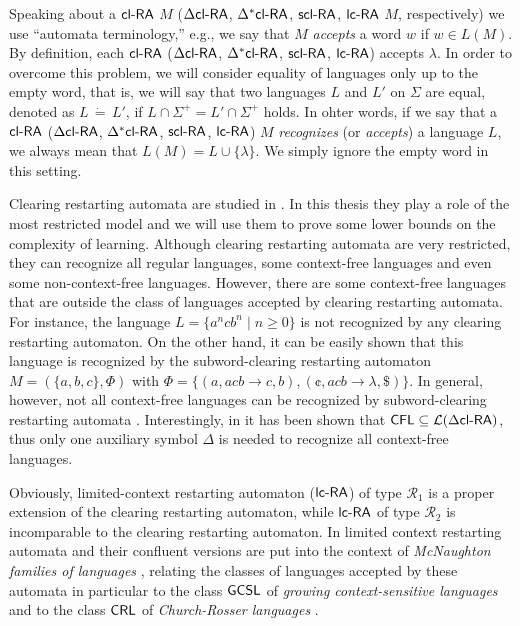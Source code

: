 \begin{remark}\label{remark:lambda}
Speaking about a $\mbox{\sf cl-RA\/}$ $M$ ($\mbox{\sf $\Delta$cl-RA\/}$, $\mbox{\sf $\Delta^*$cl-RA\/}$, $\mbox{\sf scl-RA}$, $\lcRA$ $M$, respectively) we use ``automata terminology,'' e.g., we say that $M$ \emph{accepts} a word $w$ if $w \in L(M)$. By definition, each $\mbox{\sf cl-RA\/}$ ($\mbox{\sf $\Delta$cl-RA\/}$, $\mbox{\sf $\Delta^*$cl-RA\/}$, $\mbox{\sf scl-RA}$, $\lcRA$) accepts $\lambda$. In order to overcome this problem, we will consider equality of languages only up to the empty word, that is, we will say that two languages $L$ and $L'$ on $\Sigma$ are equal, denoted as $L\, \dot{=}\, L'$, if $L\cap \Sigma^+ = L'\cap\Sigma^+$ holds. In ohter words, if we say that a $\mbox{\sf cl-RA\/}$ ($\mbox{\sf $\Delta$cl-RA\/}$, $\mbox{\sf $\Delta^*$cl-RA\/}$, $\mbox{\sf scl-RA}$, $\lcRA$) $M$ \emph{recognizes} (or \emph{accepts}) a language $L$, we always mean that $L(M) = L \cup \{\lambda\}$. We simply ignore the empty word in this setting.
\end{remark}

Clearing restarting automata are studied in \cite{CM10}. In this thesis they play a role of the most restricted model and we will use them to prove some lower bounds on the complexity of learning. Although clearing restarting automata are very restricted, they can recognize all regular languages, some context-free languages and even some non-context-free languages. However, there are some context-free languages that are outside the class of languages accepted by clearing restarting automata. For instance, the language $L = \{a^n c b^n \mid n \ge 0\}$ is not recognized by any clearing restarting automaton. On the other hand, it can be easily shown that this language is recognized by the subword-clearing restarting automaton $M = (\{a, b, c\}, \Phi)$ with $\Phi = \{(a, acb \to c, b), (\cent, acb \to \lambda, \$)\}$. In general, however, not all context-free languages can be recognized by subword-clearing restarting automata \cite{C13}. Interestingly, in \cite{CM11} it has been shown that $\CFL \subseteq \calL{\DclRA}$, thus only one auxiliary symbol $\Delta$ is needed to recognize all context-free languages. 

Obviously, limited-context restarting automaton ($\lcRA$) of type $\mathcal{R}_1$ is a proper extension of the clearing restarting automaton, while $\lcRA$ of type $\mathcal{R}_2$ is incomparable to the clearing restarting automaton. In \cite{OCM13} limited context restarting automata and their confluent versions are put into the context of \emph{McNaughton families of languages} \cite{Beaudry2003}, relating the classes of languages accepted by these automata in particular to the class $\GCSL$ of \emph{growing context-sensitive languages} \cite{Buntrock19981,Dahlhaus1986} and to the class $\CRL$ of \emph{Church-Rosser languages} \cite{MNO88}.

